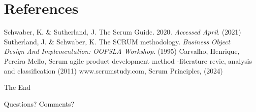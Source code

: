 \documentclass[
	11pt, %
]{beamer}
\begin{document}
\section{References}

\begin{frame}[allowframebreaks] %
	\begin{thebibliography}{91}
		Schwaber, K. \& Sutherland, J. The Scrum Guide. 2020. {\em Accessed April}. (2021)
		Sutherland, J. \& Schwaber, K. The SCRUM methodology. {\em Business Object Design And Implementation: OOPSLA Workshop}. (1995)
		Carvalho, Henrique, Pereira Mello, Scrum agile product development method -literature revie, analysis and classification (2011)
		 www.scrumstudy.com, Scrum Principles, (2024)
	\end{thebibliography}
\end{frame}



\begin{frame}[plain] %
	\begin{center}
		{\Huge The End}

		\bigskip\bigskip %

		{\LARGE Questions? Comments?}
	\end{center}
\end{frame}

\end{document}
